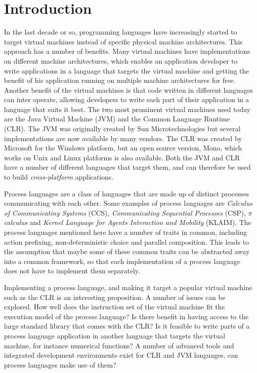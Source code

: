 \chapter{Introduction}

	In the last decade or so, programming languages have increasingly started to 
	target virtual machines instead of specific physical machine architectures. 
	This approach has a number of benefits. Many virtual machines have 
	implementations on different machine architectures, which enables an 
	application developer to write applications in a language that targets the 
	virtual machine and getting the benefit of his application running on 
	multiple machine architectures for free. Another benefit of the virtual 
	machines is that code written in different languages can inter operate, 
	allowing developers to write each part of their application in a language 
	that suits it best. The two most prominent virtual machines used today are 
	the Java Virtual Machine (JVM) and the Common Language Runtime (CLR). The 
	JVM was originally created by Sun Microtechnologies but several 
	implementations are now available by many vendors. The CLR was created by 
	Microsoft for the Windows platform, but an open source version, Mono, which 
	works on Unix and Linux platforms is also available. Both the JVM and CLR 
	have a number of different languages that target them, and can therefore be 
	used to build \textit{cross-platform} applications. 

	Process languages are a class of languages that are made up of distinct 
	processes communicating with each other. Some examples of process languages 
	are \textit{Calculus of Communicating Systems} (CCS), \textit{Communicating 
	Sequential Processes} (CSP), $\pi$ \textit{calculus} and \textit{Kernel 
	Language for Agents Interaction and Mobility} (KLAIM). The process languages 
	mentioned here have a number of traits in common, including action 
	prefixing, non-deterministic choice and parallel composition. This leads to 
	the assumption that maybe some of these common traits can be abstracted away 
	into a common framework, so that each implementation of a process language 
	does not have to implement them separately.

	Implementing a process language, and making it target a popular virtual 
	machine such as the CLR is an interesting proposition. A number of issues 
	can be explored. How well does the instruction set of the virtual machine 
	fit the execution model of the process language? Is there benefit in having 
	access to the large standard library that comes with the CLR? Is it feasible 
	to write parts of a process language application in another language that 
	targets the virtual machine, for instance numerical functions? A number of 
	advanced tools and integrated development environments exist for CLR and JVM 
	languages, can process languages make use of them? 

